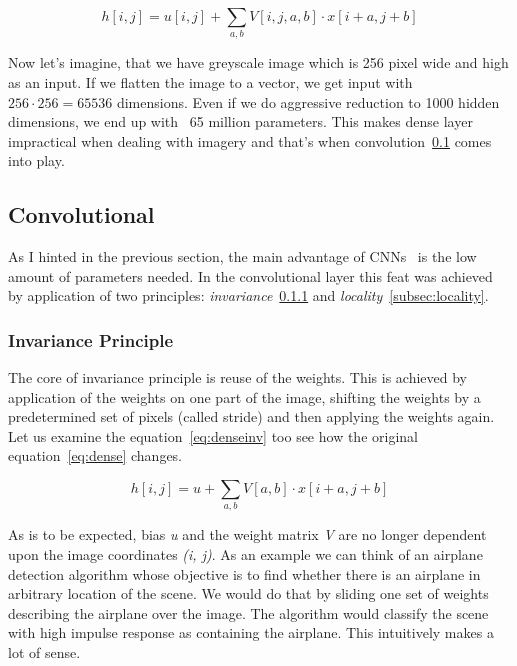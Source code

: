 \begin{equation}
    \label{eq:dense}
    h[i, j] = u[i,j] + \sum_{a,b} V[i,j,a,b] \cdot x[i+a,j+b]
\end{equation}

Now let's imagine, that we have greyscale image which is 256 pixel wide and high as an input.
If we flatten the image to a vector, we get input with $256\cdot256 = 65536$ dimensions.
Even if we do aggressive reduction to 1000 hidden dimensions, we end up with ~65 million parameters.
This makes dense layer impractical when dealing with imagery and that's when convolution~\ref{subsec:convolutional}
comes into play.

\subsection{Convolutional}\label{subsec:convolutional}
As I hinted in the previous section, the main advantage of CNNs~\cite{ConvLayer} is the low amount of parameters needed.
In the convolutional layer this feat was achieved by application of two principles:
\textit{invariance}~\ref{subsec:invariance} and \textit{locality}~\ref{subsec:locality}.

\subsubsection{Invariance Principle}\label{subsec:invariance}
The core of invariance principle is reuse of the weights.
This is achieved by application of the weights on one part of the image, shifting the weights by a predetermined set
of pixels (called stride) and then applying the weights again.
Let us examine the equation~\ref{eq:denseinv} too see how the original equation~\ref{eq:dense} changes.

\begin{equation}
    \label{eq:denseinv}
    h[i, j] = u + \sum_{a,b} V[a,b] \cdot x[i+a,j+b]
\end{equation}

As is to be expected, bias \textit{u} and the weight matrix \textit{V} are no longer dependent upon the image
coordinates \textit{(i, j)}.
As an example we can think of an airplane detection algorithm whose objective is to find whether there is an airplane
in arbitrary location of the scene.
We would do that by sliding one set of weights describing the airplane over the image.
The algorithm would classify the scene with high impulse response as containing the airplane.
This intuitively makes a lot of sense.

